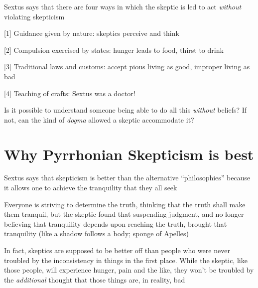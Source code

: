 \documentclass[11pt]{article}
\begin{document}
\noindent Sextus says that there are four ways in which the skeptic is led to act \emph{without} violating skepticism
\vspace*{2mm}

[1] Guidance given by nature: skeptics perceive and think
\vspace*{1mm}

[2] Compulsion exercised by states: hunger leads to food, thirst to drink
\vspace*{1mm}

[3] Traditional laws and customs: accept pious living as good, improper living as bad
\vspace*{1mm}

[4] Teaching of crafts: Sextus was a doctor!
\vspace*{2mm}

\noindent Is it possible to understand someone being able to do all this \emph{without} beliefs? If not, can the kind of \emph{dogma} allowed a skeptic accommodate it?

\section*{Why Pyrrhonian Skepticism is best}

\noindent Sextus says that skepticism is better than the alternative ``philosophies'' because it allows one to achieve the tranquility that they all seek
\vspace*{2mm}

\noindent Everyone is striving to determine the truth, thinking that the truth shall make them tranquil, but the skeptic found that suspending judgment, and no longer believing that tranquility depends upon reaching the truth, brought that tranquility (like a shadow follows a body; sponge of Apelles)
\vspace*{2mm}

\noindent In fact, skeptics are supposed to be better off than people who were never troubled by the inconsistency in things in the first place. While the skeptic, like those people, will experience hunger, pain and the like, they won't be troubled by the \emph{additional} thought that those things are, in reality, bad 
\end{document}

